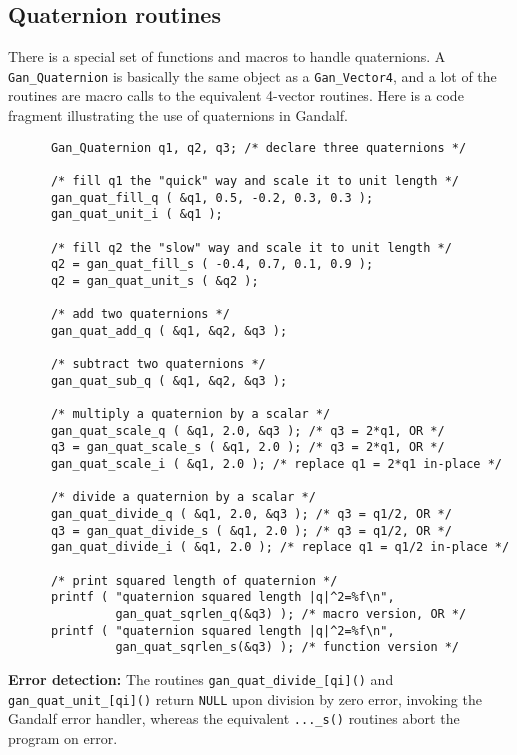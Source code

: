 \subsection{Quaternion routines}
There is a special set of functions and macros to handle quaternions.
A {\tt Gan\_Quaternion} is basically the same object as a {\tt Gan\_Vector4},
and a lot of the routines are macro calls to the equivalent 4-vector routines.
Here is a code fragment illustrating the use of quaternions in Gandalf.
\begin{verbatim}
      Gan_Quaternion q1, q2, q3; /* declare three quaternions */

      /* fill q1 the "quick" way and scale it to unit length */
      gan_quat_fill_q ( &q1, 0.5, -0.2, 0.3, 0.3 );
      gan_quat_unit_i ( &q1 );

      /* fill q2 the "slow" way and scale it to unit length */
      q2 = gan_quat_fill_s ( -0.4, 0.7, 0.1, 0.9 );
      q2 = gan_quat_unit_s ( &q2 );

      /* add two quaternions */
      gan_quat_add_q ( &q1, &q2, &q3 );

      /* subtract two quaternions */
      gan_quat_sub_q ( &q1, &q2, &q3 );

      /* multiply a quaternion by a scalar */
      gan_quat_scale_q ( &q1, 2.0, &q3 ); /* q3 = 2*q1, OR */
      q3 = gan_quat_scale_s ( &q1, 2.0 ); /* q3 = 2*q1, OR */
      gan_quat_scale_i ( &q1, 2.0 ); /* replace q1 = 2*q1 in-place */

      /* divide a quaternion by a scalar */
      gan_quat_divide_q ( &q1, 2.0, &q3 ); /* q3 = q1/2, OR */
      q3 = gan_quat_divide_s ( &q1, 2.0 ); /* q3 = q1/2, OR */
      gan_quat_divide_i ( &q1, 2.0 ); /* replace q1 = q1/2 in-place */

      /* print squared length of quaternion */
      printf ( "quaternion squared length |q|^2=%f\n",
               gan_quat_sqrlen_q(&q3) ); /* macro version, OR */
      printf ( "quaternion squared length |q|^2=%f\n",
               gan_quat_sqrlen_s(&q3) ); /* function version */
\end{verbatim}

{\bf Error detection:} The routines {\tt gan\_quat\_divide\_[qi]()} and
{\tt gan\_quat\_unit\_[qi]()} return {\tt NULL} upon division by zero error,
invoking the Gandalf error handler,
whereas the equivalent {\tt ...\_s()} routines abort the program on error.

